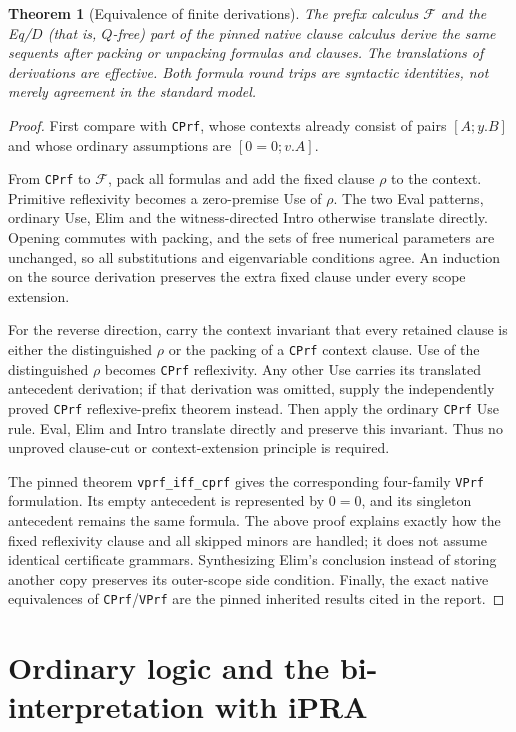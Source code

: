 \documentclass[11pt]{article}
\newtheorem{theorem}{Theorem}[section]
\theoremstyle{definition}\newtheorem{definition}[theorem]{Definition}
\theoremstyle{remark}\newtheorem{remark}[theorem]{Remark}
\newcommand{\F}{\mathcal F}
\newcommand{\code}[1]{\texttt{#1}}
\begin{document}
\begin{theorem}[Equivalence of finite derivations]
The prefix calculus $\F$ and the Eq/$D$ (that is, $Q$-free) part of the
pinned native clause calculus derive
the same sequents after packing or unpacking formulas and clauses.
The translations of derivations are effective. Both formula round trips
are syntactic identities, not merely agreement in the standard model.
\end{theorem}
\begin{proof}
First compare with \code{CPrf}, whose contexts already consist of pairs
$[A;y.B]$ and whose ordinary assumptions are $[0=0;v.A]$.

From \code{CPrf} to $\F$, pack all formulas and add the fixed clause
$\rho$ to the context.  Primitive reflexivity becomes a zero-premise
Use of $\rho$.  The two Eval patterns, ordinary Use, Elim and the
witness-directed Intro otherwise translate directly.  Opening commutes
with packing, and the sets of free numerical parameters are unchanged,
so all substitutions and eigenvariable conditions agree.  An induction
on the source derivation preserves the extra fixed clause under every
scope extension.

For the reverse direction, carry the context invariant that every
retained clause is either the distinguished $\rho$ or the packing of a
\code{CPrf} context clause.  Use of the distinguished $\rho$ becomes
\code{CPrf} reflexivity.  Any other Use carries its translated
antecedent derivation; if that derivation was omitted, supply the
independently proved \code{CPrf} reflexive-prefix theorem instead.
Then apply the ordinary \code{CPrf} Use rule.  Eval, Elim and Intro
translate directly and preserve this invariant.  Thus no unproved
clause-cut or context-extension principle is required.

The pinned theorem \code{vprf\_iff\_cprf} gives the corresponding
four-family \code{VPrf} formulation.  Its empty antecedent is represented
by $0=0$, and its singleton antecedent remains the same formula.
The above proof explains exactly how the fixed reflexivity clause and
all skipped minors are handled; it does not assume identical certificate
grammars.  Synthesizing Elim's conclusion instead of storing another
copy preserves its outer-scope side condition.  Finally, the exact
native equivalences of \code{CPrf}/\code{VPrf} are the pinned inherited
results cited in the report.
\end{proof}

\section{Ordinary logic and the bi-interpretation with iPRA}
\label{sec:biinterpretation}
\end{document}
